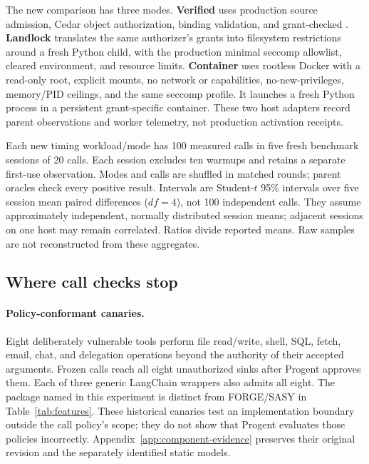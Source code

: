 The new comparison has three modes. \textbf{Verified} uses production source
admission, Cedar object authorization, binding validation, and grant-checked
. \textbf{Landlock} translates the same authorizer's grants
into filesystem restrictions around a fresh Python child, with the production
minimal seccomp allowlist, cleared environment, and resource limits.
\textbf{Container} uses rootless Docker with a read-only root, explicit mounts,
no network or capabilities, no-new-privileges, memory/PID ceilings, and the same
seccomp profile. It launches a fresh Python process in a persistent grant-specific
container. These two host adapters record parent observations and worker
telemetry, not production activation receipts.

Each new timing workload/mode has 100 measured calls in five fresh benchmark
sessions of 20 calls. Each session excludes ten warmups and retains a separate
first-use observation. Modes and calls are shuffled in matched rounds; parent
oracles check every positive result. Intervals are Student-$t$ 95\% intervals
over five session mean paired differences ($df=4$), not 100 independent calls.
They assume approximately independent, normally distributed session means;
adjacent sessions on one host may remain correlated. Ratios divide reported
means. Raw samples are not reconstructed from these aggregates.

\subsection{Where call checks stop}
\label{sec:effect-gap}

\paragraph{Policy-conformant canaries.}
Eight deliberately vulnerable tools perform file read/write, shell, SQL, fetch,
email, chat, and delegation operations beyond the authority of their accepted
arguments. Frozen calls reach all eight unauthorized sinks after Progent
approves them. Each of three generic LangChain wrappers also admits all eight.
The package named  in this experiment is distinct from
FORGE/SASY in Table~\ref{tab:features}. These historical canaries test an
implementation boundary outside the call policy's scope; they do not show that
Progent evaluates those policies incorrectly. Appendix~\ref{app:component-evidence}
preserves their original revision and the separately identified static models.

